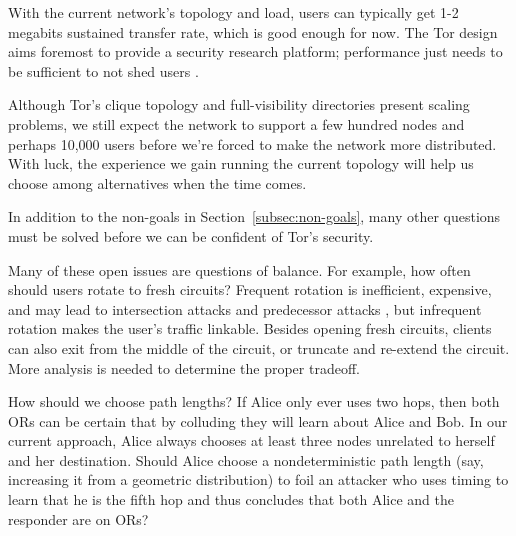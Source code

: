 \documentclass[times,10pt,twocolumn]{article}
\begin{document}

With the current network's topology and load, users can typically get 1-2
megabits sustained transfer rate, which is good enough for now. The Tor
design aims foremost to provide a security research platform; performance
just needs to be sufficient to not shed users \cite{econymics,back01}.

Although Tor's clique topology and full-visibility directories present
scaling problems, we still expect the network to support a few hundred
nodes and perhaps 10,000 users before we're forced to make the network
more distributed. With luck, the experience we gain running the current
topology will help us choose among alternatives when the time comes.

\label{sec:maintaining-anonymity}

In addition to the non-goals in
Section~\ref{subsec:non-goals}, many other questions must be solved
before we can be confident of Tor's security.

Many of these open issues are questions of balance. For example,
how often should users rotate to fresh circuits? Frequent rotation
is inefficient, expensive, and may lead to intersection attacks and
predecessor attacks \cite{wright03}, but infrequent rotation makes the
user's traffic linkable. Besides opening fresh circuits, clients can
also exit from the middle of the circuit,
or truncate and re-extend the circuit. More analysis is
needed to determine the proper tradeoff.

%

How should we choose path lengths? If Alice only ever uses two hops,
then both ORs can be certain that by colluding they will learn about
Alice and Bob. In our current approach, Alice always chooses at least
three nodes unrelated to herself and her destination.
%
Should Alice choose a nondeterministic path length (say,
increasing it from a geometric distribution) to foil an attacker who
uses timing to learn that he is the fifth hop and thus concludes that
both Alice and the responder are on ORs?
\end{document}
